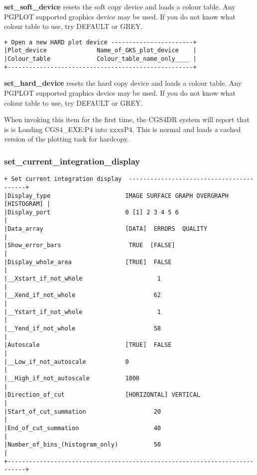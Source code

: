 {{\bf set\_soft\_device} resets the soft copy device and loads a colour table.
Any PGPLOT supported graphics device may be used. If you do not know what 
colour table to use, try {\sf DEFAULT} or {\sf GREY}.

\begin{verbatim}
+ Open a new HARD plot device -----------------------+
|Plot_device              Name_of_GKS_plot_device    |
|Colour_table             Colour_table_name_only____ |
+----------------------------------------------------+
\end{verbatim}

{\bf set\_hard\_device} resets the hard copy device and loads a colour table.
Any PGPLOT supported graphics device may be used. If you do not know what 
colour table to use, try {\sf DEFAULT} or {\sf GREY}.

When invoking this item for the first time, the CGS4DR system will report
that is is {\sf Loading CGS4\_EXE:P4 into xxxxP4}. This is normal and loads
a cached version of the plotting task for hardcopy.

\subsubsection{set\_current\_integration\_display}
\label{set_current_integration_display}
\begin{verbatim}
+ Set current integration display  -----------------------------------------+
|Display_type                     IMAGE SURFACE GRAPH OVERGRAPH [HISTOGRAM] |
|Display_port                     0 [1] 2 3 4 5 6                           |
|Data_array                       [DATA]  ERRORS  QUALITY                   |
|Show_error_bars                   TRUE  [FALSE]                            |
|Display_whole_area               [TRUE]  FALSE                             |
|__Xstart_if_not_whole                     1                                |
|__Xend_if_not_whole                      62                                |
|__Ystart_if_not_whole                     1                                |
|__Yend_if_not_whole                      58                                |
|Autoscale                        [TRUE]  FALSE                             |
|__Low_if_not_autoscale           0                                         |
|__High_if_not_autoscale          1000                                      |
|Direction_of_cut                 [HORIZONTAL] VERTICAL                     |
|Start_of_cut_summation                   20                                |
|End_of_cut_summation                     40                                |
|Number_of_bins_(histogram_only)          50                                |
+---------------------------------------------------------------------------+
\end{verbatim}

}
